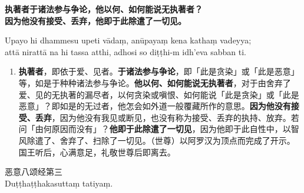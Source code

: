\textbf{执著者于诸法参与争论，他以何、如何能说无执著者？\\}
\textbf{因为他没有接受、丢弃，他即于此除遣了一切见。}

Upayo hi dhammesu upeti vādaṃ, anūpayaṃ kena kathaṃ vadeyya;\\
attā nirattā na hi tassa atthi, adhosi so diṭṭhi-m idh’eva sabban ti. %

\begin{enumerate}\item \textbf{执著者}，即依于爱、见者。\textbf{于诸法参与争论}，即「此是贪染」或「此是恶意」等，如是于种种诸法参与争论。\textbf{他以何、如何能说无执著者}，对于由舍弃了爱、见的无执著的漏尽者，以何贪染或嗔恨、如何能说「此是贪染」或「此是恶意」？即如是的无过者，他怎会如外道一般覆藏所作的意思。\textbf{因为他没有接受、丢弃}，因为他没有我见或断见，也没有称为接受、丢弃的执持、放弃。若问「由何原因而没有」？\textbf{他即于此除遣了一切见}，因为他即于此自性中，以智风除遣了、舍弃了、扫除了一切见。（世尊）以阿罗汉为顶点而完成了开示。国王听后，心满意足，礼敬世尊后即离去。\end{enumerate}

\begin{center}\vspace{1em}恶意八颂经第三\\Duṭṭhaṭṭhakasuttaṃ tatiyaṃ.\end{center}